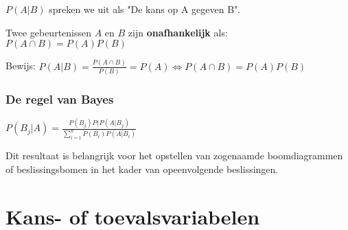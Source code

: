 \documentclass[a4paper,12pt]{article}
\begin{document}
$P(A|B)$ spreken we uit als "De kans op A gegeven B".

Twee gebeurtenissen $A$ en $B$ zijn \textbf{onafhankelijk} als:
$P(A\cap B) = P(A)P(B)$

Bewijs: $P(A|B) = \frac{P(A\cap B)}{P(B)} =P(A) 
\Leftrightarrow P(A\cap B) = P(A)P(B)$

\subsubsection{De regel van Bayes}
$P(B_j|A) = 
\frac{P(B_j)P(P(A|B_j)}{\sum^n_{i=1}P(B_i)P(A|B_i)}$

Dit resultaat is belangrijk voor het opstellen van zogenaamde boomdiagrammen of beslissingsbomen in het kader van opeenvolgende beslissingen.

\section{Kans- of toevalsvariabelen}
\end{document}
